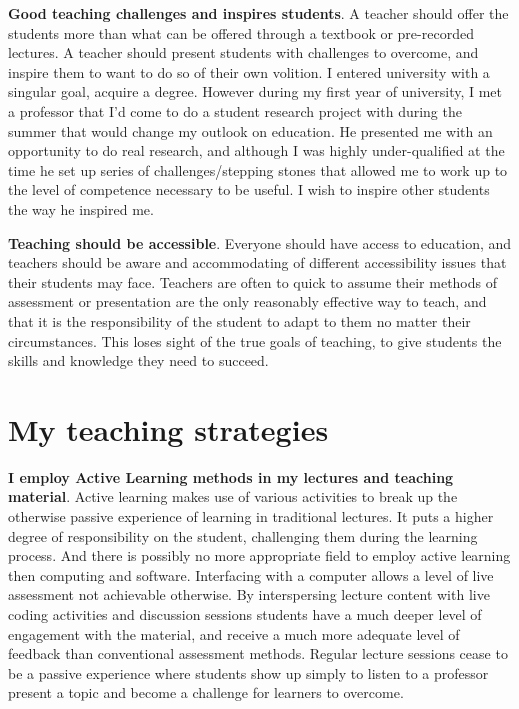 \documentclass[12pt]{report}
\begin{document}
\noindent
\textbf{Good teaching challenges and inspires students}. A teacher should offer the
students more than what can be offered through a textbook or pre-recorded
lectures. A teacher should present students with challenges to overcome, and
inspire them to want to do so of their own volition. I entered university with
a singular goal, acquire a degree. However during my first year of university,
I met a professor that I'd come to do a student research project with during
the summer that would change my outlook on education. He presented me with an
opportunity to do real research, and although I was highly under-qualified at
the time he set up series of challenges/stepping stones that allowed me to
work up to the level of competence necessary to be useful. I wish to inspire
other students the way he inspired me.

\noindent
\textbf{Teaching should be accessible}. Everyone should have access to education, and
teachers should be aware and accommodating of different accessibility issues
that their students may face. Teachers are often to quick to assume their
methods of assessment or presentation are the only reasonably effective way to
teach, and that it is the responsibility of the student to adapt to them no matter
their circumstances. This loses sight of the true goals of teaching, to give
students the skills and knowledge they need to succeed.

\section{My teaching strategies}
\label{sec:orgdae85cd}

\textbf{I employ Active Learning methods in my lectures and teaching material}.
Active learning makes use of various activities to break up the otherwise
passive experience of learning in traditional lectures. It puts a higher
degree of responsibility on the student, challenging them during the learning
process. And there is possibly no more appropriate field to employ active
learning then computing and software. Interfacing with a computer allows a
level of live assessment not achievable otherwise. By interspersing lecture
content with live coding activities and discussion sessions students have a
much deeper level of engagement with the material, and receive a much more
adequate level of feedback than conventional assessment methods. Regular
lecture sessions cease to be a passive experience where students show up
simply to listen to a professor present a topic and become a challenge for
learners to overcome.
\end{document}
